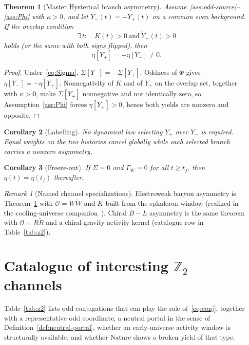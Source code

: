 \documentclass[11pt]{article}
\newtheorem{theorem}{Theorem}[section]
\newtheorem{corollary}[theorem]{Corollary}
\theoremstyle{definition}
\theoremstyle{remark}
\newtheorem{remark}{Remark}
\begin{document}
\begin{theorem}[Master Hysterical branch asymmetry]
\label{thm:master}
Assume~\ref{ass:odd-source}--\ref{ass:Phi} with $\kappa>0$, and let
$Y_-(t)=-Y_+(t)$ on a common even background.
If the overlap condition
\begin{equation}
\label{eq:overlap}
\exists\,t:\quad K(t)>0\ \text{and}\ \dot Y_+(t)>0
\end{equation}
holds (or the same with both signs flipped), then
\begin{equation}
\label{eq:master}
\boxed{\eta[Y_+]=-\eta[Y_-]\neq0.}
\end{equation}
\end{theorem}

\begin{proof}
Under~\eqref{eq:Sigma}, $\Sigma[Y_-]=-\Sigma[Y_+]$.
Oddness of $\Phi$ gives $\eta[Y_-]=-\eta[Y_+]$.
Nonnegativity of $K$ and of $\dot Y_+$ on the overlap set, together with
$\kappa>0$, make $\Sigma[Y_+]$ nonnegative and not identically zero, so
Assumption~\ref{ass:Phi} forces $\eta[Y_+]>0$, hence both yields are nonzero
and opposite.
\end{proof}

\begin{corollary}[Labelling]
\label{cor:labeling}
No dynamical law selecting $Y_+$ over $Y_-$ is required.
Equal weights on the two histories cancel globally while each selected branch
carries a nonzero asymmetry.
\end{corollary}

\begin{corollary}[Freeze-out]
\label{cor:freezeout}
If $\Sigma=0$ and $\Gamma_W=0$ for all $t\ge t_f$, then
$\eta(t)=\eta(t_f)$ thereafter.
\end{corollary}

\begin{remark}[Named channel specializations]
\label{rem:channels}
Electroweak baryon asymmetry is Theorem~\ref{thm:master}
with $\mathcal O=W\widetilde W$ and $K$ built from the sphaleron window
(realized in the cooling-universe companion~\cite{boyd2026cooling}).
Chiral $B\!-\!L$ asymmetry is the same theorem with
$\mathcal O=R\widetilde R$ and a chiral-gravity activity kernel
(catalogue row in Table~\ref{tab:z2}).
\end{remark}

\section{Catalogue of interesting $\mathbb Z_2$ channels}
\label{sec:catalogue}
Table~\ref{tab:z2} lists odd conjugations that can play the role of~\eqref{eq:conj},
together with a representative odd coordinate, a neutral portal in the sense of
Definition~\ref{def:neutral-portal}, whether an early-universe activity window is
structurally available, and whether Nature shows a broken yield of that type.
\end{document}
